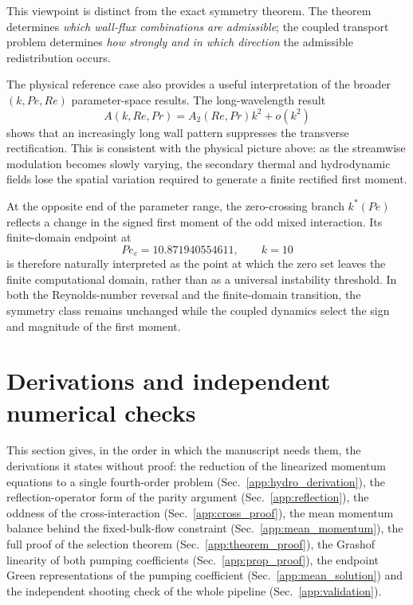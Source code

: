 \documentclass[12pt,a4paper]{article}
\newcommand{\Rey}{\mathit{Re}}
\newcommand{\Pe}{\mathit{Pe}}
\renewcommand{\Pr}{\mathit{Pr}}
\begin{document}
This viewpoint is distinct from the exact symmetry theorem. The theorem
determines \emph{which wall-flux combinations are admissible}; the coupled
transport problem determines \emph{how strongly and in which direction} the
admissible redistribution occurs.

The physical reference case also provides a useful interpretation of the
broader $(k,\Pe,\Rey)$ parameter-space results. The long-wavelength result
\begin{equation}
A(k,\Rey,\Pr)=A_2(\Rey,\Pr)k^2+o(k^2)
\end{equation}
shows that an increasingly long wall pattern suppresses the transverse
rectification. This is consistent with the physical picture above: as the
streamwise modulation becomes slowly varying, the secondary thermal and
hydrodynamic fields lose the spatial variation required to generate a
finite rectified first moment.

At the opposite end of the parameter range, the zero-crossing branch
$k^*(\Pe)$ reflects a change in the signed first moment of the odd mixed
interaction. Its finite-domain endpoint at
\begin{equation}
\Pe_c=10.871940554611,
\qquad
k=10
\end{equation}
is therefore naturally interpreted as the point at which the zero set leaves
the finite computational domain, rather than as a universal instability
threshold. In both the Reynolds-number reversal and the finite-domain
transition, the symmetry class remains unchanged while the coupled dynamics
select the sign and magnitude of the first moment.

\clearpage
\section{Derivations and independent numerical checks}
\label{sec:derivations}
This section gives, in the order in which the manuscript needs them, the
derivations it states without proof: the reduction of the linearized momentum
equations to a single fourth-order problem (Sec.~\ref{app:hydro_derivation}), the
reflection-operator form of the parity argument (Sec.~\ref{app:reflection}), the
oddness of the cross-interaction (Sec.~\ref{app:cross_proof}), the mean momentum
balance behind the fixed-bulk-flow constraint
(Sec.~\ref{app:mean_momentum}), the full proof of the selection theorem
(Sec.~\ref{app:theorem_proof}), the Grashof linearity of both pumping
coefficients (Sec.~\ref{app:prop_proof}), the endpoint Green representations of
the pumping coefficient (Sec.~\ref{app:mean_solution}) and the independent
shooting check of the whole pipeline (Sec.~\ref{app:validation}).
\end{document}
